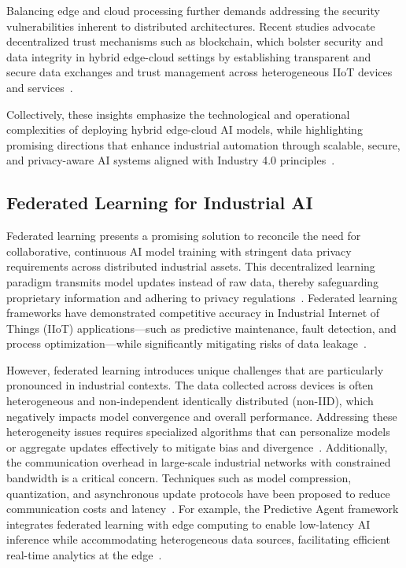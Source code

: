 \documentclass[sigconf]{acmart}
\begin{document}
Balancing edge and cloud processing further demands addressing the security vulnerabilities inherent to distributed architectures. Recent studies advocate decentralized trust mechanisms such as blockchain, which bolster security and data integrity in hybrid edge-cloud settings by establishing transparent and secure data exchanges and trust management across heterogeneous IIoT devices and services~\cite{ref31}.

Collectively, these insights emphasize the technological and operational complexities of deploying hybrid edge-cloud AI models, while highlighting promising directions that enhance industrial automation through scalable, secure, and privacy-aware AI systems aligned with Industry 4.0 principles~\cite{ref33}.

\subsection{Federated Learning for Industrial AI}

Federated learning presents a promising solution to reconcile the need for collaborative, continuous AI model training with stringent data privacy requirements across distributed industrial assets. This decentralized learning paradigm transmits model updates instead of raw data, thereby safeguarding proprietary information and adhering to privacy regulations~\cite{ref32}. Federated learning frameworks have demonstrated competitive accuracy in Industrial Internet of Things (IIoT) applications—such as predictive maintenance, fault detection, and process optimization—while significantly mitigating risks of data leakage~\cite{ref34}.

However, federated learning introduces unique challenges that are particularly pronounced in industrial contexts. The data collected across devices is often heterogeneous and non-independent identically distributed (non-IID), which negatively impacts model convergence and overall performance. Addressing these heterogeneity issues requires specialized algorithms that can personalize models or aggregate updates effectively to mitigate bias and divergence~\cite{ref36}. Additionally, the communication overhead in large-scale industrial networks with constrained bandwidth is a critical concern. Techniques such as model compression, quantization, and asynchronous update protocols have been proposed to reduce communication costs and latency~\cite{ref36}. For example, the Predictive Agent framework integrates federated learning with edge computing to enable low-latency AI inference while accommodating heterogeneous data sources, facilitating efficient real-time analytics at the edge~\cite{ref37}.
\end{document}
